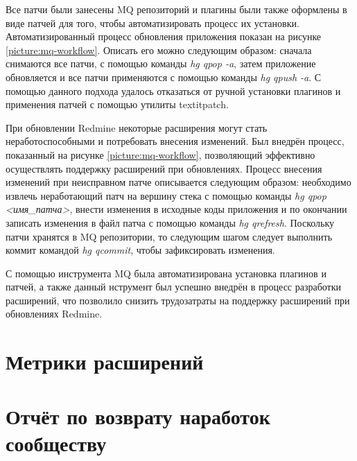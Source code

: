 Все патчи были занесены MQ репозиторий и плагины были также оформлены в виде
патчей для того, чтобы автоматизировать процесс их установки.
Автоматизированный процесс обновления приложения показан на рисунке
\ref{picture:mq-workflow}. Описать его можно следующим образом: сначала
снимаются все патчи, с помощью команды \textit{hg qpop -a}, затем приложение
обновляется и все патчи применяются с помощью команды \textit{hg qpush -a}. С
помощью данного подхода удалось отказаться от ручной установки плагинов и
применения патчей с помощью утилиты textit{patch}.

При обновлении Redmine некоторые расширения могут стать неработоспособными и
потребовать внесения изменений. Был внедрён процесс, показанный на рисунке
\ref{picture:mq-workflow}, позволяющий эффективно осуществлять поддержку
расширений при обновлениях. Процесс внесения изменений при неисправном патче
описывается следующим образом: необходимо извлечь неработающий патч на вершину
стека с помощью команды \textit{hg qpop <имя\_патча>}, внести изменения в
исходные коды приложения и по окончании записать изменения в файл патча с
помощью команды \textit{hg qrefresh}. Поскольку патчи хранятся в MQ
репозитории, то следующим шагом следует выполнить коммит командой \textit{hg
qcommit}, чтобы зафиксировать изменения.

С помощью инструмента MQ была автоматизирована установка плагинов и патчей, а
также данный нструмент был успешно внедрён в процесс разработки расширений,
что позволило снизить трудозатраты на поддержку расширений при обновлениях
Redmine.

\section{Метрики расширений}
\section{Отчёт по возврату наработок сообществу}




